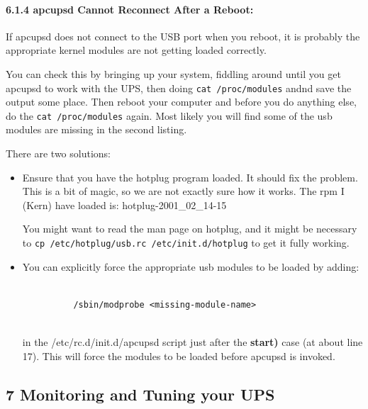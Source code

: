 \label{apcupsd-Cannot-Reconnect-After-a-Reboot}

\paragraph*{6.1.4 apcupsd Cannot Reconnect After a Reboot:}

\label{index-Problems_002c-reconnect-108}
If apcupsd does not connect to the USB port when you reboot, it is probably
the appropriate kernel modules are not getting loaded correctly.  

You can check this by bringing up your system, fiddling around until you get
apcupsd to work with the UPS, then doing {\tt cat /proc/modules} andnd save
the output some place. Then reboot your computer and before you do anything
else, do the {\tt cat /proc/modules} again. Most likely you will find some of
the usb modules are missing in the second listing.  

There are two solutions:  

\begin{itemize}
\item Ensure that you have the hotplug program loaded. It should fix the
problem. This is a bit of magic, so we are not exactly sure how it works. The
rpm I (Kern) have loaded is: hotplug-2001\_02\_14-15  

You might want to read the man page on hotplug, and it might be necessary to
{\tt cp /etc/hotplug/usb.rc /etc/init.d/hotplug} to get it fully working.  
\item You can explicitly force the appropriate usb modules to be loaded by
adding:  

\footnotesize
\begin{verbatim}
          
          /sbin/modprobe <missing-module-name>
     
\end{verbatim}
\normalsize

in the /etc/rc.d/init.d/apcupsd script just after the {\bf start)} case (at
about line 17). This will force the modules to be loaded before apcupsd is
invoked. 
\end{itemize}

\label{Monitoring-and-Tuning-your-UPS}

\subsection*{7 Monitoring and Tuning your UPS}

